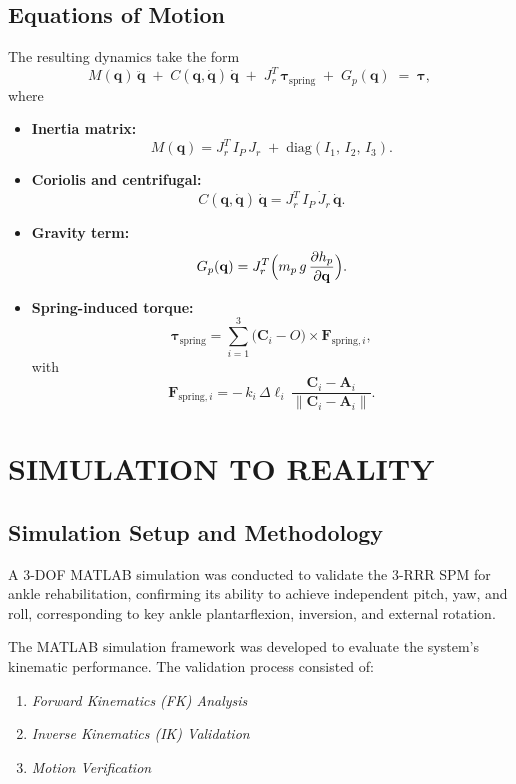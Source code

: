 \documentclass[letterpaper, 10 pt, conference]{ieeeconf}  %
\begin{document}
\subsection{Equations of Motion}
The resulting dynamics take the form
\[
  M(\mathbf{q})\,\ddot{\mathbf{q}}
  \;+\;
  C(\mathbf{q},\dot{\mathbf{q}})\,\dot{\mathbf{q}}
  \;+\;
  J_r^T\,\boldsymbol{\tau}_{\mathrm{spring}}
  \;+\;
  G_p(\mathbf{q})
  \;=\;
  \boldsymbol{\tau},
\]
where
\begin{itemize}
  \item \textbf{Inertia matrix:}
    \[
      M(\mathbf{q})
      = J_r^T\,I_P\,J_r \;+\; \mathrm{diag}(I_1,\,I_2,\,I_3).
    \]
  \item \textbf{Coriolis and centrifugal:}
    \[
      C(\mathbf{q},\dot{\mathbf{q}})\,\dot{\mathbf{q}}
      = J_r^T\,I_P\,\dot J_r\,\dot{\mathbf{q}}.
    \]
  \item \textbf{Gravity term:}
    \[
      G_p(\mathbf{q})
      = J_r^T\Bigl(m_p\,g\,\frac{\partial h_p}{\partial \mathbf{q}}\Bigr).
    \]
  \item \textbf{Spring-induced torque:}
    \[
      \boldsymbol{\tau}_{\mathrm{spring}}
      = \sum_{i=1}^3 \bigl(\mathbf{C}_i - O\bigr)
        \times \mathbf{F}_{\mathrm{spring},i},
    \]
    with
    \[
      \mathbf{F}_{\mathrm{spring},i}
      = -\,k_i\,\Delta\ell_i\,
        \frac{\mathbf{C}_i - \mathbf{A}_i}
             {\|\mathbf{C}_i - \mathbf{A}_i\|}.
    \]
\end{itemize}

\section{SIMULATION TO REALITY}

\subsection{Simulation Setup and Methodology}
A 3-DOF MATLAB simulation was conducted to validate the 3-RRR SPM for ankle rehabilitation, confirming its ability to achieve independent pitch, yaw, and roll, corresponding to key ankle plantarflexion, inversion, and external rotation.

The MATLAB simulation framework was developed to evaluate the system’s kinematic performance. The validation process consisted of:
\begin{enumerate}
    \item \textit{Forward Kinematics (FK) Analysis}
    \item \textit{Inverse Kinematics (IK) Validation}
    \item \textit{Motion Verification}
\end{enumerate}
\end{document}

